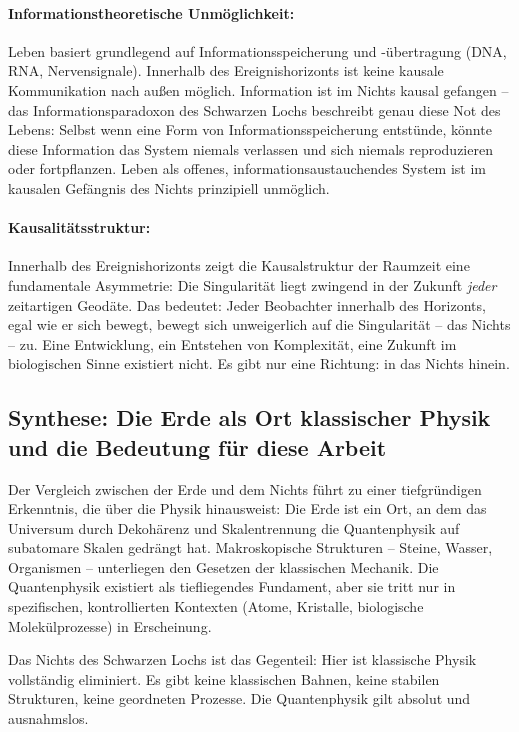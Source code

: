 ﻿\documentclass[12pt,a4paper]{report}
\begin{document}
\paragraph{Informationstheoretische Unmöglichkeit:}
Leben basiert grundlegend auf Informationsspeicherung und -übertragung (DNA, RNA, Nervensignale). Innerhalb des Ereignishorizonts ist keine kausale Kommunikation nach außen möglich. Information ist im Nichts kausal gefangen -- das Informationsparadoxon des Schwarzen Lochs \cite{hawking1975,bekenstein1973} beschreibt genau diese Not des Lebens: Selbst wenn eine Form von Informationsspeicherung entstünde, könnte diese Information das System niemals verlassen und sich niemals reproduzieren oder fortpflanzen. Leben als offenes, informationsaustauchendes System ist im kausalen Gefängnis des Nichts prinzipiell unmöglich.

\paragraph{Kausalitätsstruktur:}
Innerhalb des Ereignishorizonts zeigt die Kausalstruktur der Raumzeit eine fundamentale Asymmetrie: Die Singularität liegt zwingend in der Zukunft \emph{jeder} zeitartigen Geodäte. Das bedeutet: Jeder Beobachter innerhalb des Horizonts, egal wie er sich bewegt, bewegt sich unweigerlich auf die Singularität -- das Nichts -- zu. Eine Entwicklung, ein Entstehen von Komplexität, eine Zukunft im biologischen Sinne existiert nicht. Es gibt nur eine Richtung: in das Nichts hinein.

\subsection{Synthese: Die Erde als Ort klassischer Physik und die Bedeutung für diese Arbeit}

Der Vergleich zwischen der Erde und dem Nichts führt zu einer tiefgründigen Erkenntnis, die über die Physik hinausweist: Die Erde ist ein Ort, an dem das Universum durch Dekohärenz und Skalentrennung die Quantenphysik auf subatomare Skalen gedrängt hat. Makroskopische Strukturen -- Steine, Wasser, Organismen -- unterliegen den Gesetzen der klassischen Mechanik. Die Quantenphysik existiert als tiefliegendes Fundament, aber sie tritt nur in spezifischen, kontrollierten Kontexten (Atome, Kristalle, biologische Molekülprozesse) in Erscheinung.

Das Nichts des Schwarzen Lochs ist das Gegenteil: Hier ist klassische Physik vollständig eliminiert. Es gibt keine klassischen Bahnen, keine stabilen Strukturen, keine geordneten Prozesse. Die Quantenphysik gilt absolut und ausnahmslos.
\end{document}
